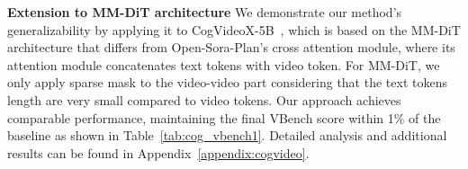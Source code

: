\begin{comment}
\begin{wraptable}{r}{0.5\textwidth}
\scriptsize \centering
\caption{Results on Open-Sora-Plan with 93 frames and 720p resolution. We select key measure of motion smoothness and temporal flickering that are crucial for sparse attention methods.}
\begin{tabular}{cccc}
\toprule
\textbf{Model} & \makecell{\textbf{Motion} \\ \textbf{Smoothness}} & \makecell{\textbf{Temporal} \\ \textbf{Flickering}}  & \textbf{Speedup}  \\
\midrule
Base & 99.15\% & 98.76\%  & 1.00$\times$  \\ 
MLCD & 99.30\% & 99.22\%  & 5.00$\times$  \\ 
\midrule
$\text{Ours}_{r\text{=0.150}}$ & 99.08\% & 99.31\%  & 7.40$\times$   \\ 
\bottomrule
\end{tabular}
\end{wraptable}

\end{comment}

\textbf{Extension to MM-DiT architecture} We demonstrate our method's generalizability by applying it to CogVideoX-5B~\cite{yang2024cogvideox}, which is based on the MM-DiT architecture that differs from Open-Sora-Plan's cross attention module, where its attention module concatenates text tokens with video token. For MM-DiT, we only apply sparse mask to the video-video part considering that the text tokens length are very small compared to video tokens. Our approach achieves comparable performance, maintaining the final VBench score within 1\% of the baseline as shown in Table~\ref{tab:cog_vbench1}. Detailed analysis and additional results can be found in Appendix~\ref{appendix:cogvideo}.

